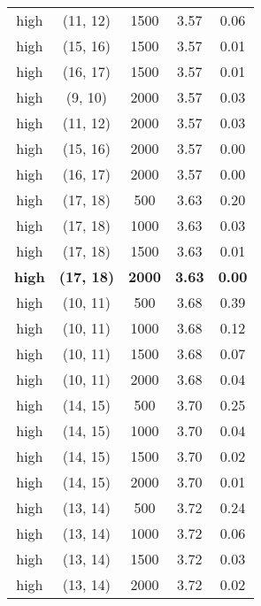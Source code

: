 \begin{tabular}{c c c c c}
high & (11, 12) &  1500 & 3.57 & 0.06 \\
high & (15, 16) &  1500 & 3.57 & 0.01 \\
high & (16, 17) &  1500 & 3.57 & 0.01 \\
high & (9, 10) &  2000 & 3.57 & 0.03 \\
high & (11, 12) &  2000 & 3.57 & 0.03 \\
high & (15, 16) &  2000 & 3.57 & 0.00 \\
high & (16, 17) &  2000 & 3.57 & 0.00 \\
high & (17, 18) &  500 & 3.63 & 0.20 \\
high & (17, 18) &  1000 & 3.63 & 0.03 \\
high & (17, 18) &  1500 & 3.63 & 0.01 \\
\textbf{high} & \textbf{(17, 18)} & \textbf{ 2000} & \textbf{3.63} & \textbf{0.00} \\
high & (10, 11) &  500 & 3.68 & 0.39 \\
high & (10, 11) &  1000 & 3.68 & 0.12 \\
high & (10, 11) &  1500 & 3.68 & 0.07 \\
high & (10, 11) &  2000 & 3.68 & 0.04 \\
high & (14, 15) &  500 & 3.70 & 0.25 \\
high & (14, 15) &  1000 & 3.70 & 0.04 \\
high & (14, 15) &  1500 & 3.70 & 0.02 \\
high & (14, 15) &  2000 & 3.70 & 0.01 \\
high & (13, 14) &  500 & 3.72 & 0.24 \\
high & (13, 14) &  1000 & 3.72 & 0.06 \\
high & (13, 14) &  1500 & 3.72 & 0.03 \\
high & (13, 14) &  2000 & 3.72 & 0.02 \\
\hline
\end{tabular}
